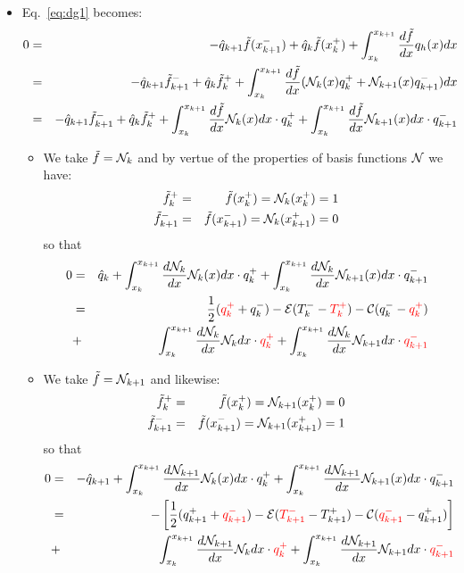 \begin{itemize}
\item Eq.~\ref{eq:dg1} becomes:
\begin{eqnarray}
0 &=&
-\hat{q}_{k+1} \tilde{f}(x_{k+1}^-)
+\hat{q}_k     \tilde{f}(x_k^+)
+ \int_{x_k}^{x_{k+1}} \frac{d\tilde{f}}{dx} q_h(x) dx  \nonumber\\
&=&-\hat{q}_{k+1} \tilde{f}_{k+1}^-
+\hat{q}_k     \tilde{f}_k^+
+ \int_{x_k}^{x_{k+1}} \frac{d\tilde{f}}{dx} ( {\mathcal{N}}_k(x) q_k^+ + {\mathcal{N}}_{k+1}(x)q_{k+1}^- ) dx \nonumber\\
&=& -\hat{q}_{k+1} \tilde{f}_{k+1}^-
+\hat{q}_k     \tilde{f}_k^+
+ \int_{x_k}^{x_{k+1}} \frac{d\tilde{f}}{dx} {\mathcal{N}}_k(x) dx \cdot q_k^+ 
+ \int_{x_k}^{x_{k+1}} \frac{d\tilde{f}}{dx} {\mathcal{N}}_{k+1}(x) dx \cdot q_{k+1}^- 
\end{eqnarray}

\begin{itemize}
\item We take $\tilde{f}={\mathcal{N}}_k$ and by vertue of the properties of basis functions ${\mathcal{N}}$ we have: 
\begin{eqnarray}
\tilde{f}_k^+&=&\tilde{f}(x_k^+) = {\mathcal{N}}_k(x_k^+)=1 \nonumber\\
\tilde{f}_{k+1}^-&=&\tilde{f}(x_{k+1}^-)   = {\mathcal{N}}_k(x_{k+1}^+)=0 \nonumber
\end{eqnarray}
so that 
\begin{eqnarray}
0 
&=& \hat{q}_k   
+ \int_{x_k}^{x_{k+1}} \frac{d{\mathcal{N}}_k}{dx} {\mathcal{N}}_k(x) dx \cdot q_k^+ 
+ \int_{x_k}^{x_{k+1}} \frac{d{\mathcal{N}}_k}{dx} {\mathcal{N}}_{k+1}(x) dx \cdot q_{k+1}^- \nonumber\\ 
&=& 
\frac{1}{2}({\color{red}q_k^+} + q_k^-) - {\cal E} (T_k^- - {\color{red}T_k^+}) 
- {\cal C}(q_k^- - {\color{red}q_k^+}) \nonumber\\
&+& \int_{x_k}^{x_{k+1}} \frac{d{\mathcal{N}}_k}{dx} {\mathcal{N}}_k dx \cdot {\color{red}q_k^+ }
+ \int_{x_k}^{x_{k+1}} \frac{d{\mathcal{N}}_k}{dx} {\mathcal{N}}_{k+1} dx \cdot {\color{red} q_{k+1}^-} \label{eq:dg4}
\end{eqnarray}

\item We take $\tilde{f}={\mathcal{N}}_{k+1}$ and likewise:
\begin{eqnarray}
\tilde{f}_k^+&=&\tilde{f}(x_k^+) = {\mathcal{N}}_{k+1}(x_k^+)=0 \nonumber\\
\tilde{f}_{k+1}^-&=&\tilde{f}(x_{k+1}^-)   = {\mathcal{N}}_{k+1}(x_{k+1}^+)=1 \nonumber
\end{eqnarray}
so that 
\begin{eqnarray}
0 
&=& -\hat{q}_{k+1} 
+ \int_{x_k}^{x_{k+1}} \frac{d{\mathcal{N}}_{k+1}}{dx} {\mathcal{N}}_k(x) dx \cdot q_k^+ 
+ \int_{x_k}^{x_{k+1}} \frac{d{\mathcal{N}}_{k+1}}{dx} {\mathcal{N}}_{k+1}(x) dx \cdot q_{k+1}^- \nonumber\\ 
&=& - \left[
\frac{1}{2}(q_{k+1}^+ + {\color{red}q_{k+1}^-}) - {\cal E} ({\color{red}T_{k+1}^-} 
- T_{k+1}^+) -{\cal C}({\color{red}q_{k+1}^-} - q_{k+1}^+) 
\right]\nonumber\\
&+& \int_{x_k}^{x_{k+1}} \frac{d{\mathcal{N}}_{k+1}}{dx} {\mathcal{N}}_k dx \cdot {\color{red}q_k^+} 
+ \int_{x_k}^{x_{k+1}} \frac{d{\mathcal{N}}_{k+1}}{dx} {\mathcal{N}}_{k+1}dx \cdot {\color{red}q_{k+1}^-}  \label{eq:dg6}
\end{eqnarray}




\end{itemize}
\end{itemize}
